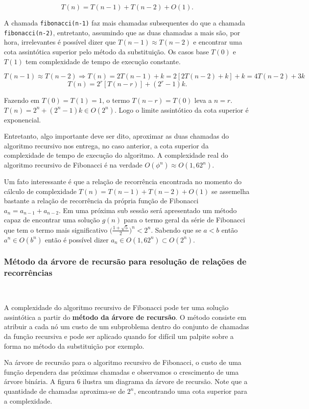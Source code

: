 \[T(n) = T(n-1) + T(n-2) + O(1).\]

A chamada \texttt{fibonacci(n-1)} faz mais chamadas subsequentes do que a chamada \texttt{fibonacci(n-2)}, entretanto, assumindo que as duas chamadas a mais são, por hora, irrelevantes é possível dizer que $T(n-1)\approx T(n-2)$ e encontrar uma cota assintótica superior pelo método da substituição. Os casos base $T(0)$ e $T(1)$ tem complexidade de tempo de execução constante.

\[T(n-1)\approx T(n-2) \Rightarrow T(n) = 2T(n-1) + k = 2[2T(n-2)+k]+k = 4T(n-2) + 3k\]
\[T(n) = 2^r[T(n-r)]+(2^{r}-1)k.\]

Fazendo em $T(0)=T(1)=1$, o termo $T(n-r)=T(0)$ leva a $n=r$. $T(n) = 2^n + (2^n-1)k \in O(2^n)$. Logo o limite assintótico da cota superior é exponencial.

Entretanto, algo importante deve ser dito, aproximar as duas chamadas do algoritmo recursivo nos entrega, no caso anterior, a cota superior da complexidade de tempo de execução do algoritmo. A complexidade real do algoritmo recursivo de Fibonacci é na verdade $O(\phi^n)\approx O(1,62^n)$.

Um fato interessante é que a relação de recorrência encontrada no momento do cálculo de complexidade $T(n)=T(n-1)+T(n-2)+O(1)$ se assemelha bastante a relação de recorrência da própria função de Fibonacci $a_n=a_{n-1}+a_{n-2}$. Em uma próxima sub sessão será apresentado um método capaz de encontrar uma solução $g(n)$ para o termo geral da série de Fibonacci que tem o termo mais significativo $\Bigr(\frac{1+\sqrt{5}}{2}\Bigr)^n < 2^n$. Sabendo que se $a<b$ então $a^n \in O(b^n)$ então é possível dizer $a_n \in O(1,62^n) \subset O(2^n)$.

\subsubsection{Método da árvore de recursão para resolução de relações de recorrências}
\

A complexidade do algoritmo recursivo de Fibonacci pode ter uma solução assintótica a partir do \textbf{método da árvore de recursão}. O método consiste em atribuir a cada nó um custo de um subproblema dentro do conjunto de chamadas da função recursiva e pode ser aplicado quando for difícil um palpite sobre a forma no método da substituição por exemplo.

Na árvore de recursão para o algoritmo recursivo de Fibonacci, o custo de uma função dependera das próximas chamadas e observamos o crescimento de uma árvore binária. A figura 6 ilustra um diagrama da árvore de recursão. Note que a quantidade de chamadas aproxima-se de $2^n$, encontrando uma cota superior para a complexidade.


